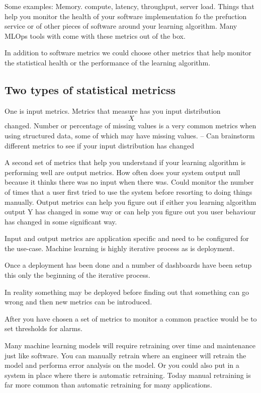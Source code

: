 Some examples: Memory. compute, latency, throughput, server load.
Things that help you monitor the health of your software implementation fo the prefuction service or of other pieces of software around your learning algorithm.
Many MLOps tools with come with these metrics out of the box.

In addition to software metrics we could choose other metrics that help monitor the statistical health or the performance of the learning algorithm.

\subsection{Two types of statistical metricss}

One is input metrics.
Metrics that measure has you input distribution $$X$$ changed.
Number or percentage of missing values is a very common metrics when using structured data, some of which may have missing values.
-- Can brainstorm different metrics to see if your input distribution has changed



A second set of metrics that help you understand if your learning algorithm is performing well are output metrics.
How often does your system output null because it thinks there was no input when there was.
Could monitor the number of times that a user first tried to use the system before resorting to doing things manually.
Output metrics can help you figure out if either you learning algorithm output Y has changed in some way or can help you figure out you user behaviour has changed in some significant way.

Input and output metrics are application specific and need to be configured for the use-case.
Machine learning is highly iterative process as is deployment.

Once a deployment has been done and a number of dashboards have been setup this only the beginning of the iterative process.

In reality something may be deployed before finding out that something can go wrong and then new metrics can be introduced.

After you have chosen a set of metrics to monitor a common practice would be to set thresholds for alarms.

Many machine learning models will require retraining over time and maintenance just like software.
You can manually retrain where an engineer will retrain the model and performa error analysis on the model.
Or you could also put in a system in place where there is automatic retraining.
Today manual retraining is far more common than automatic retraining for many applications.


